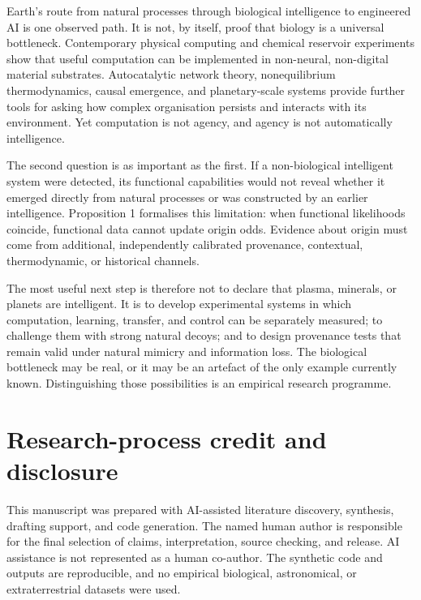 \documentclass[11pt]{article}
\begin{document}
Earth's route from natural processes through biological intelligence to engineered AI is one observed path. It is not, by itself, proof that biology is a universal bottleneck. Contemporary physical computing and chemical reservoir experiments show that useful computation can be implemented in non-neural, non-digital material substrates. Autocatalytic network theory, nonequilibrium thermodynamics, causal emergence, and planetary-scale systems provide further tools for asking how complex organisation persists and interacts with its environment. Yet computation is not agency, and agency is not automatically intelligence.

The second question is as important as the first. If a non-biological intelligent system were detected, its functional capabilities would not reveal whether it emerged directly from natural processes or was constructed by an earlier intelligence. Proposition 1 formalises this limitation: when functional likelihoods coincide, functional data cannot update origin odds. Evidence about origin must come from additional, independently calibrated provenance, contextual, thermodynamic, or historical channels.

The most useful next step is therefore not to declare that plasma, minerals, or planets are intelligent. It is to develop experimental systems in which computation, learning, transfer, and control can be separately measured; to challenge them with strong natural decoys; and to design provenance tests that remain valid under natural mimicry and information loss. The biological bottleneck may be real, or it may be an artefact of the only example currently known. Distinguishing those possibilities is an empirical research programme.

\section*{Research-process credit and disclosure}
This manuscript was prepared with AI-assisted literature discovery, synthesis, drafting support, and code generation. The named human author is responsible for the final selection of claims, interpretation, source checking, and release. AI assistance is not represented as a human co-author. The synthetic code and outputs are reproducible, and no empirical biological, astronomical, or extraterrestrial datasets were used.
\end{document}
